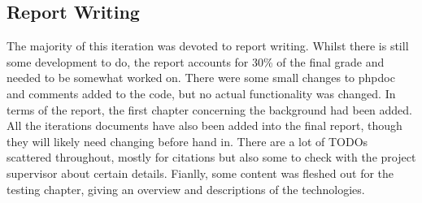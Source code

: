 \subsection{Report Writing}
The majority of this iteration was devoted to report writing. Whilst there is still some development to do, the report accounts for 30\% of the final grade and needed to be somewhat worked on. There were some small changes to phpdoc and comments added to the code, but no actual functionality was changed. In terms of the report, the first chapter concerning the background had been added. All the iterations documents have also been added into the final report, though they will likely need changing before hand in. There are a lot of TODOs scattered throughout, mostly for citations but also some to check with the project supervisor about certain details. Fianlly, some content was fleshed out for the testing chapter, giving an overview and descriptions of the technologies.
\newpage